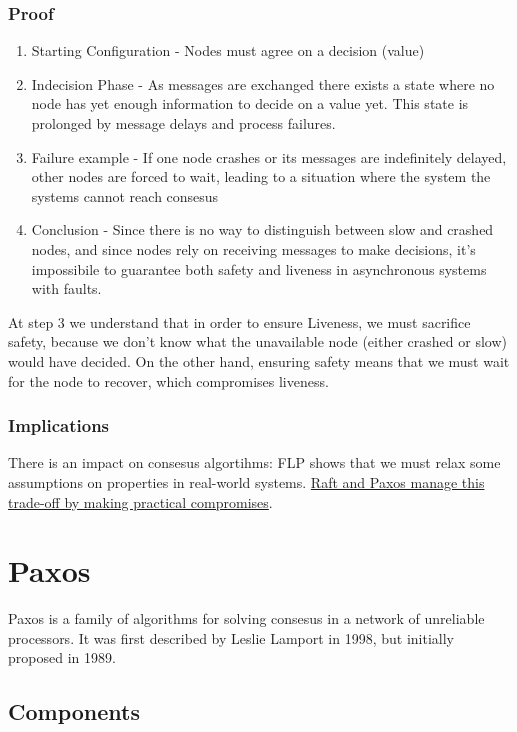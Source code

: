 \subsubsection{Proof}
\begin{enumerate}
   \item Starting Configuration - Nodes must agree on a decision (value)  
   \item Indecision Phase - As messages are exchanged there exists a state where no node has yet enough information to decide on a value yet. 
   This state is prolonged by message delays and process failures.
   \item Failure example -  If one node crashes or its messages are indefinitely delayed, other nodes are forced to wait, leading to a situation where the system the systems cannot reach consesus
   \item Conclusion -  Since there is no way to distinguish between slow and crashed nodes, and since nodes rely on receiving messages to make decisions, it's impossibile to guarantee both safety and liveness in asynchronous systems with faults.
\end{enumerate}

At step 3 we understand that in order to ensure Liveness, we must sacrifice safety, because we don't know what the unavailable node (either crashed or slow) would have decided.
On the other hand, ensuring safety means that we must wait for the node to recover, which compromises liveness.

\subsubsection{Implications}
There is an impact on consesus algortihms:
FLP shows that we must relax some assumptions on properties in real-world systems.
\ul{Raft and Paxos manage this trade-off by making practical compromises}. 



\section{Paxos}
Paxos is a family of algorithms for solving consesus in a network of unreliable processors.
It was first described by Leslie Lamport in 1998, but initially proposed in 1989.

\subsection{Components}

